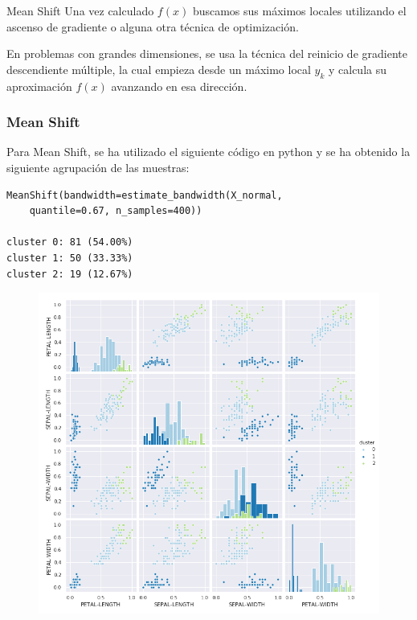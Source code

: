 \documentclass[spanish]{beamer}
\begin{document}
\begin{frame}{Mean Shift}
Una vez calculado $f(x)$ buscamos sus máximos locales utilizando el ascenso de gradiente o alguna otra técnica de optimización.\break

En problemas con grandes dimensiones, se usa la técnica del reinicio de gradiente descendiente múltiple, la cual empieza desde un máximo local $y_k$ y calcula su aproximación $f(x)$ avanzando en esa dirección.
\end{frame}

\begin{frame}[fragile]
\frametitle{Mean Shift}
Para Mean Shift, se ha utilizado el siguiente código en python y se ha obtenido la siguiente agrupación de las muestras:\break
\begin{lstlisting}
MeanShift(bandwidth=estimate_bandwidth(X_normal, 
	quantile=0.67, n_samples=400))

cluster 0: 81 (54.00%)
cluster 1: 50 (33.33%)
cluster 2: 19 (12.67%)
\end{lstlisting}
\end{frame}

\begin{frame}
\begin{figure}[h]
\centering
\includegraphics[scale=0.34]{dani/scatmatrixMeanShiftIRIS.png}
\end{figure}
\end{frame}
\end{document}
